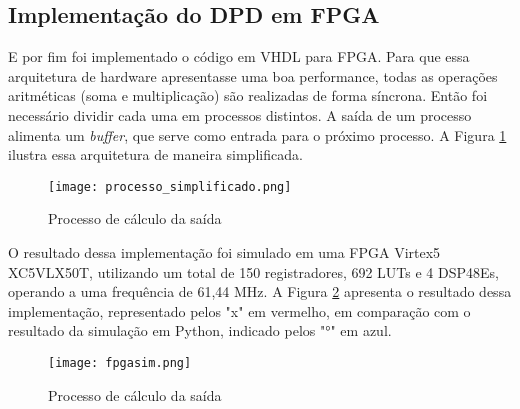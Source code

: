 \subsection{Implementação do DPD em FPGA}

E por fim foi implementado o código em VHDL para FPGA.
Para que essa arquitetura de hardware apresentasse uma boa performance, todas as operações aritméticas (soma e multiplicação) são realizadas de forma síncrona. Então foi necessário dividir cada uma em processos distintos. A saída de um processo alimenta um \textit{buffer}, que serve como entrada para o próximo processo. A Figura \ref{fig:diagramaprocesssimpl} ilustra essa arquitetura de maneira simplificada.

\begin{figure}[htbp]
	\centering
	\captionsetup{justification=centering}
	\texttt{[image: processo\_simplificado.png]}
	\caption{Processo de cálculo da saída}
	\label{fig:diagramaprocesssimpl}
\end{figure}

O resultado dessa implementação foi simulado em uma FPGA Virtex5 XC5VLX50T, utilizando um total de 150 registradores, 692 LUTs e 4 DSP48Es, operando a uma frequência de 61,44 MHz. A Figura \ref{fig:fpgasim} apresenta o resultado dessa implementação, representado pelos "x" em vermelho, em comparação com o resultado da simulação em Python, indicado pelos "°" em azul.

\begin{figure}[htbp]
	\centering
	\captionsetup{justification=centering}
	\texttt{[image: fpgasim.png]}
	\caption{Processo de cálculo da saída}
	\label{fig:fpgasim}
\end{figure}
